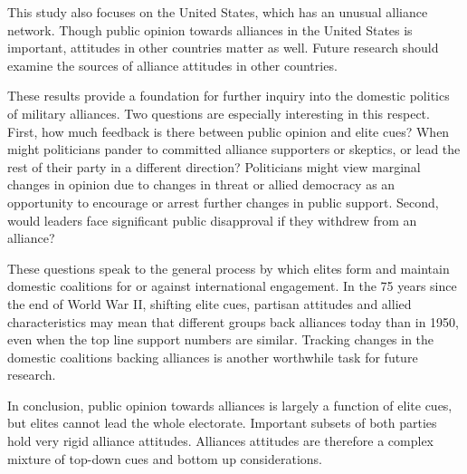 \documentclass[12pt]{article}
\begin{document}
This study also focuses on the United States, which has an unusual alliance network. 
Though public opinion towards alliances in the United States is important, attitudes in other countries matter as well. 
Future research should examine the sources of alliance attitudes in other countries. 


These results provide a foundation for further inquiry into the domestic politics of military alliances. 
Two questions are especially interesting in this respect.
First, how much feedback is there between public opinion and elite cues? 
When might politicians pander to committed alliance supporters or skeptics, or lead the rest of their party in a different direction? 
Politicians might view marginal changes in opinion due to changes in threat or allied democracy as an opportunity to encourage or arrest further changes in public support.
Second, would leaders face significant public disapproval if they withdrew from an alliance? 


These questions speak to the general process by which elites form and maintain domestic coalitions for or against international engagement. 
In the 75 years since the end of World War II, shifting elite cues, partisan attitudes and allied characteristics may mean that different groups back alliances today than in 1950, even when the top line support numbers are similar. 
Tracking changes in the domestic coalitions backing alliances is another worthwhile task for future research.


In conclusion, public opinion towards alliances is largely a function of elite cues, but elites cannot lead the whole electorate.  
Important subsets of both parties hold very rigid alliance attitudes. 
Alliances attitudes are therefore a complex mixture of top-down cues and bottom up considerations. 



\newpage

 
 
\end{document}
